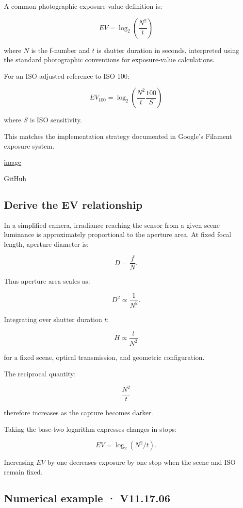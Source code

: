 A common photographic exposure-value definition is:

\[ \boxed{ EV=\log_2\left(\frac{N^2}{t}\right) } \]

where \(N\) is the f-number and \(t\) is shutter duration in seconds, interpreted using the standard photographic conventions for exposure-value calculations.

For an ISO-adjusted reference to ISO 100:

\[ \boxed{ EV_{100} = \log_2\left( \frac{N^2}{t}\frac{100}{S} \right) } \]

where \(S\) is ISO sensitivity.

This matches the implementation strategy documented in Google's Filament exposure system. 

\href{https://www.google.com/s2/favicons?domain=https://github.com&sz=32}{image}

GitHub

\subsection{Derive the EV relationship}\label{02-foundations-ii-ch036-derive-the-ev-relationship}

\hypertarget{02-foundations-ii-ch036-derive-the-ev-relationship}{}

In a simplified camera, irradiance reaching the sensor from a given scene luminance is approximately proportional to the aperture area. At fixed focal length, aperture diameter is:

\[ D=\frac fN. \]

Thus aperture area scales as:

\[ D^2\propto\frac1{N^2}. \]

Integrating over shutter duration \(t\):

\[ \boxed{ H\propto\frac t{N^2} } \]

for a fixed scene, optical transmission, and geometric configuration.

The reciprocal quantity:

\[ \frac{N^2}{t} \]

therefore increases as the capture becomes darker.

Taking the base-two logarithm expresses changes in stops:

\[ EV=\log_2(N^2/t). \]

Increasing \(EV\) by one decreases exposure by one stop when the scene and ISO remain fixed.

\subsection{Numerical example · V11.17.06}\label{02-foundations-ii-ch036-numerical-example-v11.17.06}

